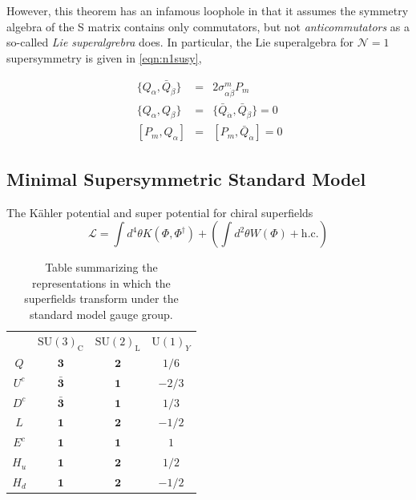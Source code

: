 However, this theorem has an infamous loophole in that it assumes the
symmetry algebra of the S matrix contains only commutators, but not
\emph{anticommutators} as a so-called \emph{Lie superalgrebra}
does. In particular, the Lie superalgebra for $\mathcal N=1$
supersymmetry is given in \ref{eqn:n1susy},

\begin{eqnarray}
~\{ Q_{\alpha},\bar Q_{\dot{\beta}}\} &=& 2\sigma^m_{\alpha\dot\beta} P_m \nonumber\\
~\{ Q_{\alpha},Q_{\beta}\} &=& \{ \bar Q_{\dot\alpha},\bar Q_{\dot\beta}\} = 0\nonumber\\
~[ P_m, Q_{\alpha}] &=& [P_m,\bar Q_{\dot\alpha}] = 0
\label{eqn:n1susy}
\end{eqnarray}

\subsection{Minimal Supersymmetric Standard Model}
The K\"{a}hler potential and super potential for chiral superfields
\begin{equation}
\mathcal L = \int d^4\theta K(\Phi,\Phi^{\dagger}) + \left (\int
  d^2\theta W(\Phi) + \mathrm{h.c.} \right)
\label{eqn:mssmlag}
\end{equation}

\begin{table}
\centering
\begin{tabular}{c|ccc}
&$\mathrm{SU(3)}_{\mathrm{C}}$&$\mathrm{SU(2)}_{\mathrm{L}}$&$\mathrm{U(1)}_Y$ \\
$Q$ & $\mathbf{3}$ & $\mathbf{2}$ & $1/6$\\
$U^c$ & $\mathbf{\bar 3}$ & $\mathbf{1}$ & $-2/3$\\
$D^c$ & $\mathbf{\bar 3}$ & $\mathbf{1}$ & $1/3$\\
$L$ & $\mathbf{1}$ & $\mathbf{2}$ & $-1/2$\\
$E^c$ & $\mathbf{1}$ & $\mathbf{1}$ & $1$\\\hline
$H_u$ & $\mathbf{1}$ & $\mathbf{2}$ & $1/2$\\
$H_d$ & $\mathbf{1}$ & $\mathbf{2}$ & $-1/2$
\end{tabular}
\caption{\label{tab:representations} Table summarizing the
    representations in which the superfields transform under the standard
    model gauge group.}
\end{table}

